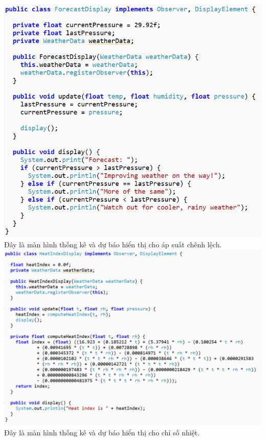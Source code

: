 \includegraphics{GALLEYS/images/chapter2/images7}\\
Đây là màn hình thống kê và dự báo hiển thị cho áp suất chênh lệch. \\
\includegraphics[width=\columnwidth,height=.45\textheight]{GALLEYS/images/chapter2/images8}\\
Đây là màn hình thống kê và dự báo hiển thị cho chỉ số nhiệt.\\\\
